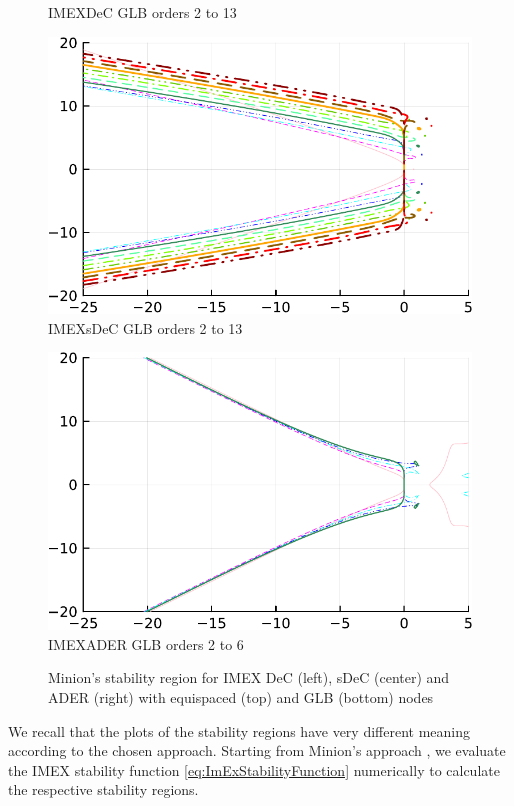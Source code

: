 \begin{figure}
\begin{minipage}[t]{0.32\textwidth}
		IMEXDeC GLB orders 2 to 13
	\end{minipage}
	\begin{minipage}[t]{0.32\textwidth}
		\centering
		\includegraphics[width=\textwidth, trim={0 0 0 0}, clip]{pdf/odepics/Minion_IMEXsDeC_GLB_ord13-crop.pdf}
		IMEXsDeC GLB orders 2 to 13
	\end{minipage}
	\begin{minipage}[t]{0.32\textwidth}
		\centering
		\includegraphics[width=\textwidth, trim={0 0 0 0}, clip]{pdf/odepics/Minion_IMEXADER_GLB_ord6-crop.pdf}
		IMEXADER GLB orders 2 to 6
	\end{minipage}
	\caption{Minion's stability region for IMEX DeC (left), sDeC (center) and ADER (right) with equispaced (top) and GLB (bottom) nodes}
	\label{fig: ODEIMEX}
\end{figure}
We recall that the plots of the stability regions have very different meaning according to the chosen approach. 
Starting from Minion's approach \cite{minion2003dec}, we evaluate the IMEX stability function \eqref{eq:ImExStabilityFunction} numerically to calculate the respective stability regions. 

